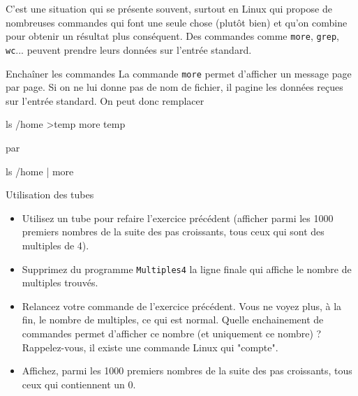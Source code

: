 \documentclass[a4paper,11pt]{article}
\begin{document}
			C'est une situation qui se pr\'esente souvent, surtout en Linux qui propose de nombreuses
			commandes qui font une seule chose (plut\^ot bien) et qu'on combine pour obtenir 
			un r\'esultat plus cons\'equent. Des commandes comme \verb_more_, \verb_grep_,
			\verb_wc_... peuvent prendre leurs donn\'ees sur l'entr\'ee standard.
					
          
		\begin{Exemple}{Enchaîner les commandes} 
			La commande \verb_more_ permet d'afficher un message page par page.
			Si on ne lui donne pas de nom de fichier, il pagine les donn\'ees re\c cues sur l'entr\'ee standard. 
			On peut donc remplacer
				
                  	 \begin{Console}
				ls /home >temp
				more temp
			\end{Console}
					par
				
                		 \begin{Console}
				ls /home | more
			\end{Console}
			
		\end{Exemple}
			
		\begin{Exercice}{Utilisation des tubes}
				\begin{itemize}
				
						\item Utilisez un tube pour refaire l'exercice pr\'ec\'edent
						(afficher parmi les 1000 premiers nombres de la suite des pas croissants,
						tous ceux qui sont des multiples de 4).
					
						\item Supprimez du programme \verb_Multiples4_
							la ligne finale qui affiche le nombre de multiples trouv\'es. 
					
						\item Relancez votre commande de l'exercice pr\'ec\'edent.
							Vous ne voyez plus, \`a la fin, le nombre de multiples, ce qui est normal.
							Quelle enchainement de commandes permet d'afficher ce nombre
							(et uniquement ce nombre) ? Rappelez-vous, il existe une commande Linux qui "compte". 
					
						\item Affichez, parmi les 1000 premiers nombres 
							de la suite des pas croissants, tous ceux qui contiennent un 0.
					
					\end{itemize}
	\end{Exercice}
\end{document}

